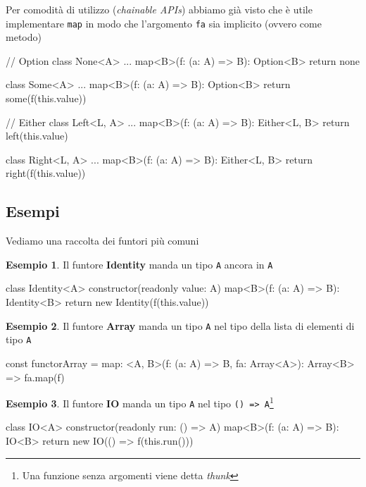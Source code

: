 \documentclass[12pt]{article}
\theoremstyle{definition}
\newtheorem{example}{Esempio}[section]
\newenvironment{code}
  {\vspace{0.5cm} \VerbatimEnvironment\begin{typescriptcode}}
  {\end{typescriptcode} \vspace{0.2cm}}
\begin{document}
Per comodità di utilizzo (\emph{chainable APIs}) abbiamo già visto che è utile implementare \texttt{map} in modo che
l'argomento \texttt{fa} sia implicito (ovvero come metodo)

\begin{code}
// Option
class None<A> {
  ...
  map<B>(f: (a: A) => B): Option<B> {
    return none
  }
}

class Some<A> {
  ...
  map<B>(f: (a: A) => B): Option<B> {
    return some(f(this.value))
  }
}

// Either
class Left<L, A> {
  ...
  map<B>(f: (a: A) => B): Either<L, B> {
    return left(this.value)
  }
}

class Right<L, A> {
  ...
  map<B>(f: (a: A) => B): Either<L, B> {
    return right(f(this.value))
  }
}
\end{code}

\subsection{Esempi}

Vediamo una raccolta dei funtori più comuni

\begin{example}
Il funtore \textbf{Identity} manda un tipo \texttt{A} ancora in \texttt{A}

\begin{code}
class Identity<A> {
  constructor(readonly value: A) {}
  map<B>(f: (a: A) => B): Identity<B> {
    return new Identity(f(this.value))
  }
}
\end{code}
\end{example}

\begin{example}
Il funtore \textbf{Array} manda un tipo \texttt{A} nel tipo della lista di elementi di tipo \texttt{A}

\begin{code}
const functorArray = {
  map: <A, B>(f: (a: A) => B, fa: Array<A>): Array<B> =>
    fa.map(f)
}
\end{code}
\end{example}

\begin{example}
Il funtore \textbf{IO} manda un tipo \texttt{A} nel tipo \texttt{() => A}\footnote{Una funzione senza argomenti viene detta \emph{thunk}}

\begin{code}
class IO<A> {
  constructor(readonly run: () => A) {}
  map<B>(f: (a: A) => B): IO<B> {
    return new IO(() => f(this.run()))
  }
}
\end{code}
\end{example}
\end{document}
